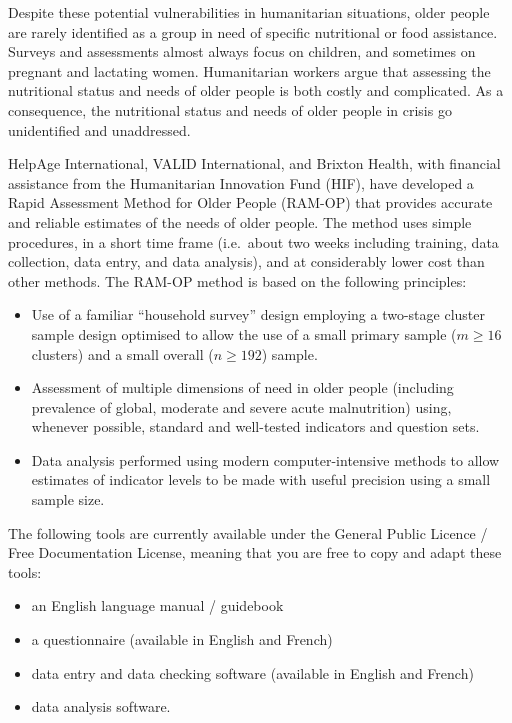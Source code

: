 \documentclass[12pt,a4paper]{book}
\begin{document}
Despite these potential vulnerabilities in humanitarian situations, older people are rarely identified as a group in need of specific nutritional or food assistance. Surveys and assessments almost always focus on children, and sometimes on pregnant and lactating women. Humanitarian workers argue that assessing the nutritional status and needs of older people is both costly and complicated. As a consequence, the nutritional status and needs of older people in crisis go unidentified and unaddressed.

HelpAge International, VALID International, and Brixton Health, with financial assistance from the Humanitarian Innovation Fund (HIF), have developed a Rapid Assessment Method for Older People (RAM-OP) that provides accurate and reliable estimates of the needs of older people. The method uses simple procedures, in a short time frame (i.e.~about two weeks including training, data collection, data entry, and data analysis), and at considerably lower cost than other methods. The RAM-OP method is based on the following principles:

\begin{itemize}
\item
  Use of a familiar ``household survey'' design employing a two-stage cluster sample design optimised to allow the use of a small primary sample (\(m ≥ 16\) clusters) and a small overall (\(n ≥ 192\)) sample.
\item
  Assessment of multiple dimensions of need in older people (including prevalence of global, moderate and severe acute malnutrition) using, whenever possible, standard and well-tested indicators and question sets.
\item
  Data analysis performed using modern computer-intensive methods to allow estimates of indicator levels to be made with useful precision using a small sample size.
\end{itemize}

The following tools are currently available under the General Public Licence / Free Documentation License, meaning that you are free to copy and adapt these tools:

\begin{itemize}
\item
  an English language manual / guidebook
\item
  a questionnaire (available in English and French)
\item
  data entry and data checking software (available in English and French)
\item
  data analysis software.
\end{itemize}
\end{document}
